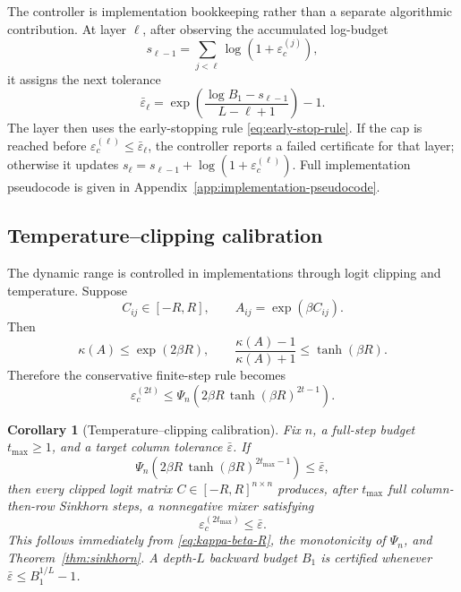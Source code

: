 \documentclass[11pt]{article}
\numberwithin{equation}{section}
\theoremstyle{plain}
\newtheorem{corollary}[theorem]{Corollary}
\theoremstyle{definition}
\theoremstyle{remark}
\begin{document}
The controller is implementation bookkeeping rather than a separate algorithmic
contribution.  At layer \(\ell\), after observing the accumulated log-budget
\[
    s_{\ell-1}=\sum_{j<\ell}\log(1+\varepsilon_c^{(j)}),
\]
it assigns the next tolerance
\begin{equation}\label{eq:adaptive-budget-implementation-target}
    \bar\varepsilon_\ell
    =
    \exp\!\left(
    \frac{\log B_1-s_{\ell-1}}{L-\ell+1}
    \right)-1.
\end{equation}
The layer then uses the early-stopping rule \eqref{eq:early-stop-rule}.  If the
cap is reached before \(\varepsilon_c^{(\ell)}\le\bar\varepsilon_\ell\), the
controller reports a failed certificate for that layer; otherwise it updates
\(s_\ell=s_{\ell-1}+\log(1+\varepsilon_c^{(\ell)})\).  Full implementation
pseudocode is given in Appendix~\ref{app:implementation-pseudocode}.

\subsection{Temperature--clipping calibration}\label{subsec:temperature_clipping}
The dynamic range is controlled in implementations through logit clipping and temperature. Suppose
\begin{equation}
        C_{ij}\in[-R,R],
        \qquad
        A_{ij}=\exp(\beta C_{ij}).
\end{equation}
Then
\begin{equation}\label{eq:kappa-beta-R}
        \kappa(A)\le \exp(2\beta R),
        \qquad
        \frac{\kappa(A)-1}{\kappa(A)+1}\le \tanh(\beta R).
\end{equation}
Therefore the conservative finite-step rule becomes
\begin{equation}\label{eq:beta-R-cert}
        \varepsilon_c^{(2t)}
        \le
        \Psi_n\!\left(2\beta R\,\tanh(\beta R)^{2t-1}\right).
\end{equation}

\begin{corollary}[Temperature--clipping calibration]
\label{cor:temperature-clipping}
Fix $n$, a full-step budget $t_{\max}\ge1$, and a target column tolerance $\bar\varepsilon$. If
\begin{equation}\label{eq:temperature-clipping-condition}
        \Psi_n\!\left(2\beta R\,\tanh(\beta R)^{2t_{\max}-1}\right)
        \le
        \bar\varepsilon,
\end{equation}
then every clipped logit matrix $C\in[-R,R]^{n\times n}$ produces, after $t_{\max}$ full column-then-row Sinkhorn steps, a nonnegative mixer satisfying
\[
        \varepsilon_c^{(2t_{\max})}\le \bar\varepsilon.
\]
This follows immediately from \eqref{eq:kappa-beta-R}, the monotonicity of $\Psi_n$, and Theorem~\ref{thm:sinkhorn}. A depth-$L$ backward budget $B_1$ is certified whenever $\bar\varepsilon\le B_1^{1/L}-1$.
\end{corollary}
\end{document}
